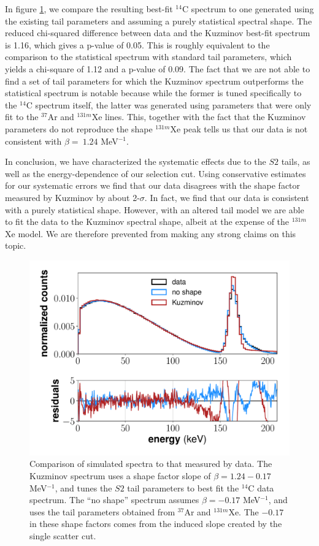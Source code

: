 In figure \ref{fig:C14_shape}, we compare the resulting best-fit $^{14}$C spectrum to one generated using the existing tail parameters and assuming a purely statistical spectral shape. The reduced chi-squared difference between data and the Kuzminov best-fit spectrum is 1.16, which gives a p-value of 0.05. This is roughly equivalent to the comparison to the statistical spectrum with standard tail parameters, which yields a chi-square of 1.12 and a p-value of 0.09. The fact that we are not able to find a set of tail parameters for which the Kuzminov spectrum outperforms the statistical spectrum is notable because while the former is tuned specifically to the $^{14}$C spectrum itself, the latter was generated using parameters that were only fit to the $^{37}$Ar and $^{131m}$Xe lines. This, together with the fact that the Kuzminov parameters do not reproduce the shape $^{131m}$Xe peak tells us that our data is not consistent with $\beta = \ 1.24$ MeV$^{-1}$.

In conclusion, we have characterized the systematic effects due to the $S2$ tails, as well as the energy-dependence of our selection cut. Using conservative estimates for our systematic errors we find that our data disagrees with the shape factor measured by Kuzminov by about 2-$\sigma$. In fact, we find that our data is consistent with a purely statistical shape. However, with an altered tail model we are able to fit the data to the Kuzminov spectral shape, albeit at the expense of the $^{131m}$Xe model. We are therefore prevented from making any strong claims on this topic.
\begin{figure}[!h]
\centering
  \includegraphics[width=\textwidth]{Figures/C14_spectrum_shapecomp.pdf}
\caption{Comparison of simulated spectra to that measured by data. The Kuzminov spectrum uses a shape factor slope of $\beta=1.24-0.17$ MeV$^{-1}$, and tunes the $S2$ tail parameters to best fit the $^{14}$C data spectrum. The ``no shape'' spectrum assumes $\beta=-0.17$ MeV$^{-1}$, and uses the tail parameters obtained from $^{37}$Ar and $^{131m}$Xe. The $-0.17$ in these shape factors comes from the induced slope created by the single scatter cut.}
\label{fig:C14_shape}
\end{figure}


